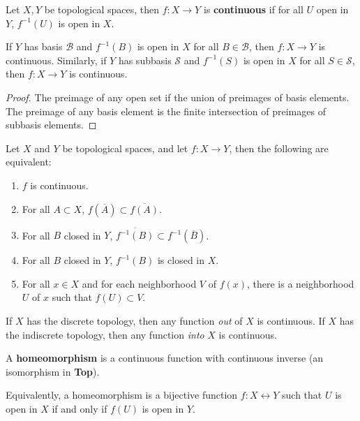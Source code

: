 \documentclass[10pt]{report}
\begin{document}
\begin{defn}
	Let $X,Y$ be topological spaces, then $f : X \to Y$ is \textbf{continuous} if for all $U$ open in $Y$, $f^{-1}(U)$ is open in $X$.
\end{defn}

\begin{prop}
	If $Y$ has basis $\mathcal{B}$ and $f^{-1}(B)$ is open in $X$ for all $B \in \mathcal{B}$, then $f: X \to Y$ is continuous.
	Similarly, if $Y$ has subbasis $\mathcal{S}$ and $f^{-1}(S)$ is open in $X$ for all $S \in \mathcal{S}$, then $f: X \to Y$ is continuous.
\end{prop}
\begin{proof}
	The preimage of any open set if the union of preimages of basis elements. The preimage of any basis element is the finite intersection of preimages of subbasis elements.
\end{proof}

\begin{thrm}
Let $X$ and $Y$ be topological spaces, and let $f: X \to Y$, then the following are equivalent:
\begin{enumerate}
	\item $f$ is continuous.
	\item For all $A \subset X$, $f(\overline{A}) \subset \overline{f(A)} $.
	\item For all $B$ closed in $Y$, $\overline{f^{-1}(B)} \subset f^{-1}(\overline{B})$.
	\item For all $B$ closed in $Y$, $f^{-1}(B)$ is closed in $X$.
	\item For all $x \in X$ and for each neighborhood $V$ of $f(x)$, there is a neighborhood $U$ of $x$ such that $f(U) \subset V$.
\end{enumerate}
\end{thrm}

\begin{ex}[]
	If $X$ has the discrete topology, then any function \textit{out} of $X$ is continuous. If $X$ has the indiscrete topology, then any function \textit{into} $X$ is continuous.
\end{ex}

\begin{defn}
	A \textbf{homeomorphism} is a continuous function with continuous inverse (an isomorphism in \textbf{Top}).

	Equivalently, a homeomorphism is a bijective function $f: X \leftrightarrow Y$ such that $U$ is open in $X$ if and only if $f(U)$ is open in $Y$.
\end{defn}
\end{document}
